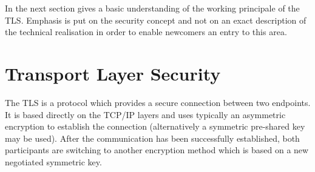 In the next section gives a basic understanding of the working principale of the TLS. Emphasis is put on the security concept and not on an exact description of the technical realisation in order to enable newcomers an entry to  this area.




\section{Transport Layer Security}


The TLS is a protocol which provides a secure connection between two endpoints.
It is based directly on the TCP/IP layers and uses typically an asymmetric encryption to establish the connection (alternatively a symmetric pre-shared key may be used).
After the communication has been successfully established, both participants are switching to another encryption method which is based on a new negotiated symmetric key.
%
%


